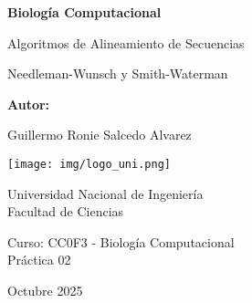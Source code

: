 \documentclass[12pt,a4paper]{article}
\begin{document}

\begin{titlepage}
\centering
\vspace*{1cm}

{\huge\bfseries Biología Computacional\par}
\vspace{0.5cm}
{\LARGE Algoritmos de Alineamiento de Secuencias\par}
\vspace{0.3cm}
{\Large Needleman-Wunsch y Smith-Waterman\par}

\vspace{2cm}

{\Large\textbf{Autor:}\par}
\vspace{0.5cm}
{\large Guillermo Ronie Salcedo Alvarez\par}

\vspace{1cm}

\texttt{[image: img/logo\_uni.png]}
\vspace{1cm}

{\large Universidad Nacional de Ingeniería\\
Facultad de Ciencias\par}

\vspace{1cm}

{\large Curso: CC0F3 - Biología Computacional\\
Práctica 02\par}

\vfill

{\large Octubre 2025\par}

\end{titlepage}

\newpage
\thispagestyle{empty}
\end{document}
